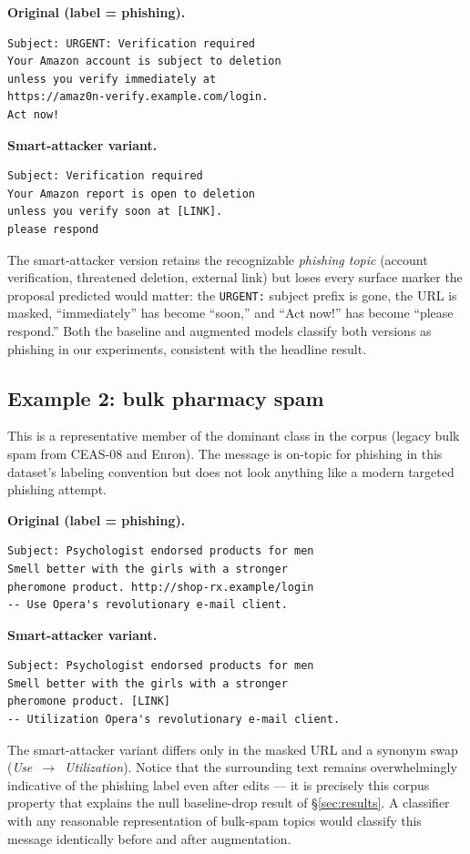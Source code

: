 \documentclass[conference]{IEEEtran}
\begin{document}
\noindent\textbf{Original (label = phishing).}
\begin{lstlisting}
Subject: URGENT: Verification required
Your Amazon account is subject to deletion
unless you verify immediately at
https://amaz0n-verify.example.com/login.
Act now!
\end{lstlisting}
\noindent\textbf{Smart-attacker variant.}
\begin{lstlisting}
Subject: Verification required
Your Amazon report is open to deletion
unless you verify soon at [LINK].
please respond
\end{lstlisting}

\noindent The smart-attacker version retains the recognizable
\textit{phishing topic} (account verification, threatened deletion,
external link) but loses every surface marker the proposal predicted
would matter: the \texttt{URGENT:} subject prefix is gone, the URL is
masked, ``immediately'' has become ``soon,'' and ``Act now!'' has become
``please respond.'' Both the baseline and augmented models classify both
versions as phishing in our experiments, consistent with the headline
result.

\subsection{Example 2: bulk pharmacy spam}

This is a representative member of the dominant class in the corpus
(legacy bulk spam from CEAS-08 and Enron). The message is on-topic for
phishing in this dataset's labeling convention but does not look anything
like a modern targeted phishing attempt.

\noindent\textbf{Original (label = phishing).}
\begin{lstlisting}
Subject: Psychologist endorsed products for men
Smell better with the girls with a stronger
pheromone product. http://shop-rx.example/login
-- Use Opera's revolutionary e-mail client.
\end{lstlisting}
\noindent\textbf{Smart-attacker variant.}
\begin{lstlisting}
Subject: Psychologist endorsed products for men
Smell better with the girls with a stronger
pheromone product. [LINK]
-- Utilization Opera's revolutionary e-mail client.
\end{lstlisting}

\noindent The smart-attacker variant differs only in the masked URL and a
synonym swap (\textit{Use}~$\rightarrow$~\textit{Utilization}). Notice
that the surrounding text remains overwhelmingly indicative of the
phishing label even after edits --- it is precisely this corpus property
that explains the null baseline-drop result of \S\ref{sec:results}. A
classifier with any reasonable representation of bulk-spam topics would
classify this message identically before and after augmentation.
\end{document}
